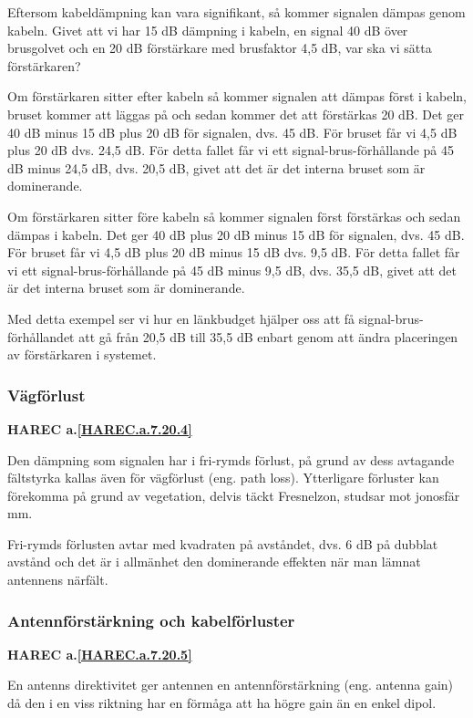 Eftersom kabeldämpning kan vara signifikant, så kommer signalen dämpas genom
kabeln.
Givet att vi har 15 dB dämpning i kabeln, en signal 40 dB över brusgolvet och
en 20 dB förstärkare med brusfaktor 4,5 dB, var ska vi sätta förstärkaren?

Om förstärkaren sitter efter kabeln så kommer signalen att dämpas först i
kabeln, bruset kommer att läggas på och sedan kommer det att förstärkas 20 dB.
Det ger 40 dB minus 15 dB plus 20 dB för signalen, dvs. 45 dB.
För bruset får vi 4,5 dB plus 20 dB dvs. 24,5 dB.
För detta fallet får vi ett signal-brus-förhållande på 45 dB minus 24,5 dB,
dvs. 20,5 dB, givet att det är det interna bruset som är dominerande.

Om förstärkaren sitter före kabeln så kommer signalen först förstärkas och
sedan dämpas i kabeln.
Det ger 40 dB plus 20 dB minus 15 dB för signalen, dvs. 45 dB.
För bruset får vi 4,5 dB plus 20 dB minus 15 dB dvs. 9,5 dB.
För detta fallet får vi ett signal-brus-förhållande på 45 dB minus 9,5 dB,
dvs. 35,5 dB, givet att det är det interna bruset som är dominerande.

Med detta exempel ser vi hur en länkbudget hjälper oss att få
signal-brus-förhållandet att gå från 20,5 dB till 35,5 dB enbart genom att
ändra placeringen av förstärkaren i systemet.

\subsubsection{Vägförlust}
\textbf{HAREC a.\ref{HAREC.a.7.20.4}\label{myHAREC.a.7.20.4}}

Den dämpning som signalen har i fri-rymds förlust, på grund av dess avtagande
fältstyrka kallas även för vägförlust (eng. path loss).
Ytterligare förluster kan förekomma på grund av vegetation, delvis täckt
Fresnelzon, studsar mot jonosfär mm.

Fri-rymds förlusten avtar med kvadraten på avståndet, dvs. 6 dB på dubblat
avstånd och det är i allmänhet den dominerande effekten när man lämnat
antennens närfält.

\subsubsection{Antennförstärkning och kabelförluster}
\textbf{HAREC a.\ref{HAREC.a.7.20.5}\label{myHAREC.a.7.20.5}}

En antenns direktivitet ger antennen en antennförstärkning (eng. antenna gain)
då den i en viss riktning har en förmåga att ha högre gain än en enkel dipol.

